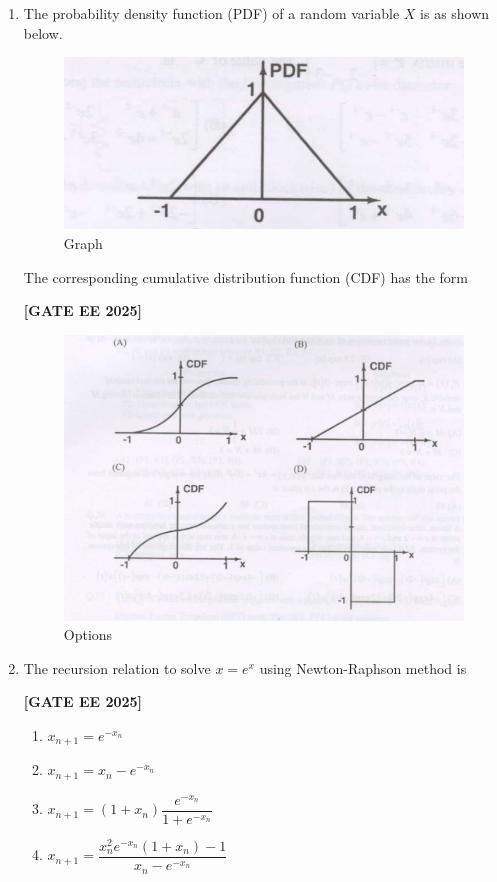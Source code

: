 \documentclass[12pt]{article}
\begin{document}
\begin{enumerate}[leftmargin=*, label=\textbf{Q.\arabic*:}]
\item
The probability density function (PDF) of a random variable $X$ is as shown below.

\begin{figure}[H]\centering
\includegraphics[width=0.5\columnwidth]{figs/q24a.png}
\caption{Graph}
\label{fig:q24a}
\end{figure}

The corresponding cumulative distribution function (CDF) has the form
 
\noindent \textbf{[GATE EE 2025]}

\begin{figure}[H]\centering
\includegraphics[width=0.95\columnwidth]{figs/q24b.png}
\caption{Options}
\label{fig:q24b}
\end{figure}

\item The recursion relation to solve $x = e^{x}$ using Newton-Raphson method is
 
\noindent \textbf{[GATE EE 2025]}
\begin{enumerate}
    \item $x_{n+1} = e^{-x_n}$
    \item $x_{n+1} = x_n - e^{-x_n}$
    \item $x_{n+1} = (1 + x_n)\dfrac{e^{-x_n}}{1 + e^{-x_n}}$
    \item $x_{n+1} = \dfrac{x_n^2 e^{-x_n} (1 + x_n) - 1}{x_n - e^{-x_n}}$
\end{enumerate}


\end{enumerate}
\end{document}
